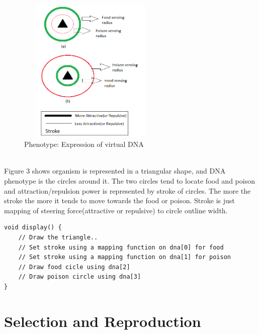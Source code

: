 \documentclass[conference]{IEEEtran}
\begin{document}
\begin{figure}
	\includegraphics[height=7cm,width=7cm]{phenotype.png}
	\caption{Phenotype: Expression of virtual DNA}
	\label{fig:phenotype}
\end{figure}
\\Figure 3 shows organism is represented in a triangular shape, and DNA phenotype is the circles around it. The two circles tend to locate food and poison and attraction/repulsion power is represented by stroke of circles. The more the stroke the more it tends to move towards the food or poison. Stroke is just mapping of steering force(attractive or repulsive) to circle outline width.
\begin{lstlisting}[caption = Adding Phenotype in Organism class]
void display() {
	// Draw the triangle..
	// Set stroke using a mapping function on dna[0] for food
	// Set stroke using a mapping function on dna[1] for poison
	// Draw food cicle using dna[2]
	// Draw poison circle using dna[3]
}
\end{lstlisting}

\section{Selection and Reproduction}
\end{document}
